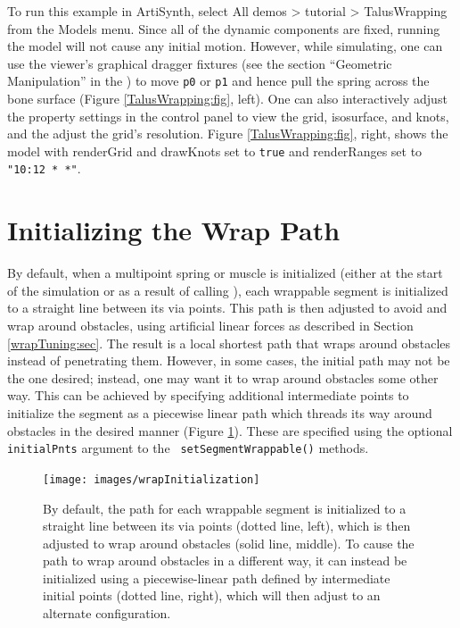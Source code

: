 To run this example in ArtiSynth, select {\sf All demos > tutorial >
TalusWrapping} from the {\sf Models} menu. Since all of the dynamic
components are fixed, running the model will not cause any initial
motion. However, while simulating, one can use the viewer's graphical
dragger fixtures (see the section ``Geometric Manipulation'' in the
) to move
{\tt p0} or {\tt p1} and hence pull the spring across the bone surface
(Figure \ref{TalusWrapping:fig}, left). One can also interactively
adjust the property settings in the control panel to view the grid,
isosurface, and knots, and the adjust the grid's resolution.  Figure
\ref{TalusWrapping:fig}, right, shows the model with {\sf renderGrid}
and {\sf drawKnots} set to {\tt true} and {\sf renderRanges} set to
{\tt "10:12 * *"}.

\section{Initializing the Wrap Path}
\label{wrappingInit:sec}

By default, when a multipoint spring or muscle is initialized (either
at the start of the simulation or as a result of calling
), each
wrappable segment is initialized to a straight line between its via
points. This path is then adjusted to avoid and wrap around obstacles,
using artificial linear forces as described in Section
\ref{wrapTuning:sec}. The result is a local shortest path that wraps
around obstacles instead of penetrating them.  However, in some cases,
the initial path may not be the one desired; instead, one may want it
to wrap around obstacles some other way. This can be achieved by
specifying additional intermediate points to initialize the segment as
a piecewise linear path which threads its way around obstacles in the
desired manner (Figure \ref{wrapInitialization:fig}).  These are
specified using the optional {\tt initialPnts} argument to the {\tt
setSegmentWrappable()} methods.

\begin{figure}[ht]
\begin{center}
 \texttt{[image: images/wrapInitialization]}
\end{center}
\caption{By default, the path for each wrappable segment is
initialized to a straight line between its via points (dotted line,
left), which is then adjusted to wrap around obstacles (solid line,
middle). To cause the path to wrap around obstacles in a different
way, it can instead be initialized using a piecewise-linear
path defined by intermediate initial points (dotted line, right),
which will then adjust to an alternate configuration.}
\label{wrapInitialization:fig}
\end{figure}

